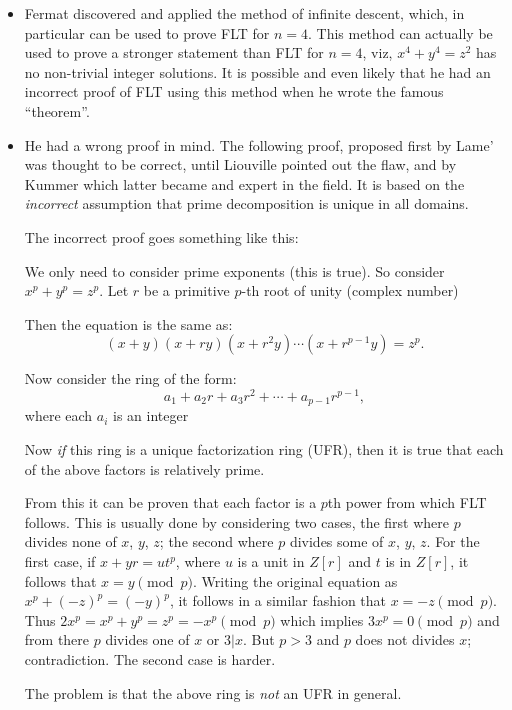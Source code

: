 \begin{itemize}
  \item Fermat discovered and applied the method of infinite descent,
  which, in particular can be used to prove FLT for $n=4$.  This method
  can actually be used to prove a stronger statement than FLT for $n=4$,
  viz, $x^4 + y^4 = z^2$ has no non-trivial integer solutions.  It is
  possible and even likely that he had an incorrect proof of FLT using
  this method when he wrote the famous ``theorem''.

  \item He had a wrong proof in mind. The following proof, proposed
  first by Lame' was thought to be correct, until Liouville pointed out
  the flaw, and by Kummer which latter became and expert in the field.
  It is based on the \emph{incorrect} assumption that prime
  decomposition is unique in all domains.

  The incorrect proof goes something like this:

  We only need to consider prime exponents (this is true).  So consider
  $x^p + y^p = z^p$.  Let $r$ be a primitive $p$-th root of unity
  (complex number)

  Then the equation is the same as:
  \[
  (x+y)(x+ry)(x+r^2y) \cdots (x+r^{p-1}y) = z^p.
  \]

  Now consider the ring of the form:
  \[
  a_1 + a_2 r + a_3 r^2 + \cdots + a_{p-1} r^{p-1},
  \]
  where each $a_i$ is an integer

  Now \emph{if} this ring is a unique factorization ring (UFR), then it
  is true that each of the above factors is relatively prime.

  From this it can be proven that each factor is a $p$th power from
  which FLT follows.  This is usually done by considering two cases, the
  first where $p$ divides none of $x$, $y$, $z$; the second where $p$
  divides some of $x$, $y$, $z$.  For the first case, if $x+yr = ut^p$,
  where $u$ is a unit in $Z[r]$ and $t$ is in $Z[r]$, it follows that
  $x=y \pmod p$. Writing the original equation as $x^p + (-z)^p =
  (-y)^p$, it follows in a similar fashion that $x = -z \pmod p$.  Thus
  $2x^p = x^p + y^p = z^p = -x^p \pmod p$ which implies $3x^p = 0 \pmod
  p$ and from there $p$ divides one of $x$ or $3|x$. But $p>3$ and $p$
  does not divides $x$; contradiction.  The second case is harder.

  The problem is that the above ring is \emph{not} an UFR in general.
\end{itemize}

